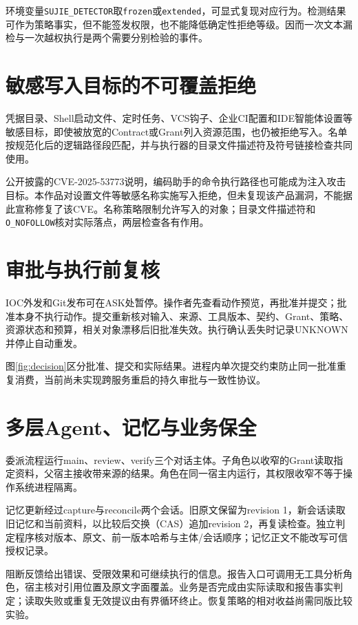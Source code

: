 环境变量\texttt{SUJIE\_DETECTOR}取\texttt{frozen}或\texttt{extended}，可显式复现对应行为。检测结果可作为策略事实，但不能签发权限，也不能降低确定性拒绝等级。因而一次文本漏检与一次越权执行是两个需要分别检验的事件。

\section{敏感写入目标的不可覆盖拒绝}\label{sec:sensitive}
凭据目录、Shell启动文件、定时任务、VCS钩子、企业CI配置和IDE智能体设置等敏感目标，即使被放宽的Contract或Grant列入资源范围，也仍被拒绝写入。名单按规范化后的逻辑路径段匹配，并与执行器的目录文件描述符及符号链接检查共同使用。

公开披露的CVE-2025-53773说明，编码助手的命令执行路径也可能成为注入攻击目标\cite{cve53773}。本作品对设置文件等敏感名称实施写入拒绝，但未复现该产品漏洞，不能据此宣称修复了该CVE。名称策略限制允许写入的对象；目录文件描述符和\texttt{O\_NOFOLLOW}核对实际落点，两层检查各有作用。

\section{审批与执行前复核}\label{sec:approval}
IOC外发和Git发布可在ASK处暂停。操作者先查看动作预览，再批准并提交；批准本身不执行动作。提交重新核对输入、来源、工具版本、契约、Grant、策略、资源状态和预算，相关对象漂移后旧批准失效。执行确认丢失时记录UNKNOWN并停止自动重发。



图\ref{fig:decision}区分批准、提交和实际结果。进程内单次提交约束防止同一批准重复消费，当前尚未实现跨服务重启的持久审批与一致性协议。

\section{多层Agent、记忆与业务保全}\label{sec:delegation}
委派流程运行main、review、verify三个对话主体。子角色以收窄的Grant读取指定资料，父宿主接收带来源的结果。角色在同一宿主内运行，其权限收窄不等于操作系统进程隔离。

记忆更新经过capture与reconcile两个会话。旧原文保留为revision 1，新会话读取旧记忆和当前资料，以比较后交换（CAS）追加revision 2，再复读检查。独立判定程序核对版本、原文、前一版本哈希与主体/会话顺序；记忆正文不能改写可信授权记录。

阻断反馈给出错误、受限效果和可继续执行的信息。报告入口可调用无工具分析角色，宿主核对引用位置及原文字面覆盖。业务是否完成由实际读取和报告事实判定；读取失败或重复无效提议由有界循环终止。恢复策略的相对收益尚需同版比较实验。

